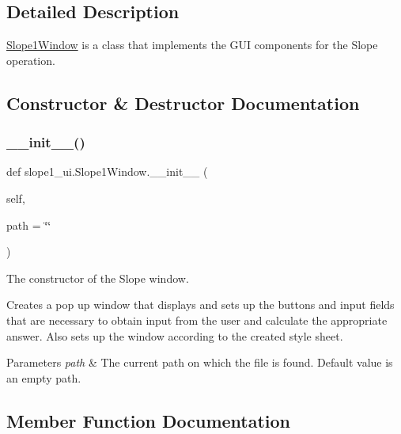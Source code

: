 \subsection{Detailed Description}
\hyperlink{classslope1__ui_1_1_slope1_window}{Slope1\+Window} is a class that implements the G\+UI components for the Slope operation. 

\subsection{Constructor \& Destructor Documentation}
\mbox{\label{classslope1__ui_1_1_slope1_window_ac6021ae35ba98357f1c982ca6e8349d9}} 
\subsubsection{\texorpdfstring{\+\_\+\+\_\+init\+\_\+\+\_\+()}{\_\_init\_\_()}}
{\footnotesize\ttfamily def slope1\+\_\+ui.\+Slope1\+Window.\+\_\+\+\_\+init\+\_\+\+\_\+ (\begin{DoxyParamCaption}\item[{}]{self,  }\item[{}]{path = {\ttfamily \char`\"{}\char`\"{}} }\end{DoxyParamCaption})}



The constructor of the Slope window. 

Creates a pop up window that displays and sets up the buttons and input fields that are necessary to obtain input from the user and calculate the appropriate answer. Also sets up the window according to the created style sheet. 
\begin{DoxyParams}{Parameters}
{\em path} & The current path on which the file is found. Default value is an empty path. \\
\hline
\end{DoxyParams}


\subsection{Member Function Documentation}
\mbox{\label{classslope1__ui_1_1_slope1_window_a780708482375f4d24622d74f573b1bf6}} 
